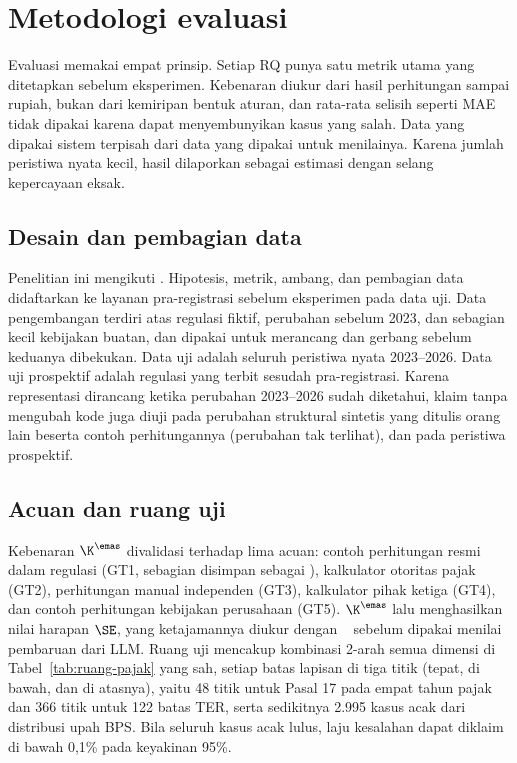 \section{Metodologi evaluasi}
\label{sec:evaluasi}

Evaluasi memakai empat prinsip. Setiap RQ punya satu metrik utama yang ditetapkan sebelum eksperimen. Kebenaran diukur dari hasil perhitungan sampai rupiah, bukan dari kemiripan bentuk aturan, dan rata-rata selisih seperti MAE tidak dipakai karena dapat menyembunyikan kasus yang salah. Data yang dipakai sistem terpisah dari data yang dipakai untuk menilainya. Karena jumlah peristiwa nyata kecil, hasil dilaporkan sebagai estimasi dengan selang kepercayaan eksak.

\subsection{Desain dan pembagian data}
Penelitian ini mengikuti . Hipotesis, metrik, ambang, dan pembagian data didaftarkan ke layanan pra-registrasi sebelum eksperimen pada data uji. Data pengembangan terdiri atas regulasi fiktif, perubahan sebelum 2023, dan sebagian kecil kebijakan buatan, dan dipakai untuk merancang  dan gerbang sebelum keduanya dibekukan. Data uji adalah seluruh peristiwa nyata 2023--2026. Data uji prospektif adalah regulasi yang terbit sesudah pra-registrasi. Karena representasi dirancang ketika perubahan 2023--2026 sudah diketahui, klaim tanpa mengubah kode juga diuji pada perubahan struktural sintetis yang ditulis orang lain beserta contoh perhitungannya (perubahan tak terlihat), dan pada peristiwa prospektif.

\subsection{Acuan dan ruang uji}
Kebenaran $\K^{\emas}$ divalidasi terhadap lima acuan: contoh perhitungan resmi dalam regulasi (GT1, sebagian disimpan sebagai ), kalkulator otoritas pajak (GT2), perhitungan manual independen (GT3), kalkulator pihak ketiga (GT4), dan contoh perhitungan kebijakan perusahaan (GT5). $\K^{\emas}$ lalu menghasilkan nilai harapan $\SE$, yang ketajamannya diukur dengan ~\cite{petrovic2021mutation} sebelum dipakai menilai pembaruan dari LLM. Ruang uji mencakup kombinasi 2-arah semua dimensi di Tabel~\ref{tab:ruang-pajak} yang sah, setiap batas lapisan di tiga titik (tepat, di bawah, dan di atasnya), yaitu 48 titik untuk Pasal 17 pada empat tahun pajak dan 366 titik untuk 122 batas TER, serta sedikitnya 2.995 kasus acak dari distribusi upah BPS. Bila seluruh kasus acak lulus, laju kesalahan dapat diklaim di bawah 0,1\% pada keyakinan 95\%.

